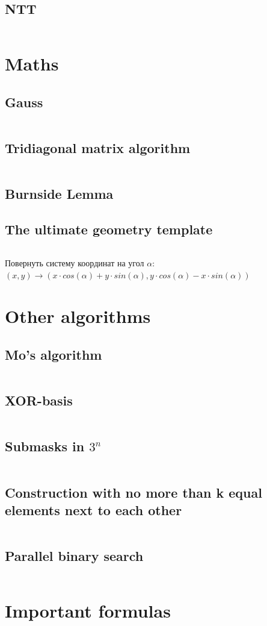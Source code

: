 ﻿\documentclass[10pt,twocolumn,oneside]{article}
\begin{document}
\subsection{NTT}
\inputminted[breaklines]{cpp}{Number theory/ntt.cpp}

\section{Maths}
\subsection{Gauss}
\inputminted[breaklines]{cpp}{Maths/gauss.cpp}
\subsection{Tridiagonal matrix algorithm}
\inputminted[breaklines]{cpp}{Maths/tridiagonal.cpp}
\subsection{Burnside Lemma}

\subsection{The ultimate geometry template}
\inputminted[breaklines]{python}{Maths/geometry.py}
Повернуть систему координат на угол $\alpha$:\\
$(x, y) \rightarrow (x \cdot cos(\alpha) + y \cdot sin(\alpha), y \cdot cos(\alpha) - x \cdot sin(\alpha))$

\section{Other algorithms}
\subsection{Mo's algorithm}
\inputminted[breaklines]{cpp}{SQRT heuristics/mo's algorithm.cpp}
\subsection{XOR-basis}
\inputminted[breaklines]{cpp}{Other algorithms/xor-basis.cpp}
\subsection{Submasks in $3^n$}
\inputminted[breaklines]{cpp}{Other algorithms/submasks.cpp}
\subsection{Construction with no more than k equal elements next to each other}
\inputminted[breaklines]{cpp}{Other algorithms/no equal neighbours.cpp}
\subsection{Parallel binary search}
\inputminted[breaklines]{cpp}{Other algorithms/parallel binsearch.cpp}

\section{Important formulas}

\end{document}
